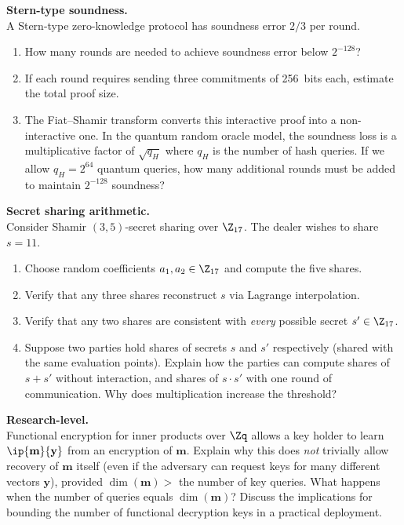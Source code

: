\begin{prob}
\label{prob:ch14-zkp}
\textbf{Stern-type soundness.}\\
A Stern-type zero-knowledge protocol has soundness error $2/3$ per round.
\begin{enumerate}
\item[(a)] How many rounds are needed to achieve soundness error below $2^{-128}$?
\item[(b)] If each round requires sending three commitments of 256~bits each, estimate the total proof size.
\item[(c)] The Fiat--Shamir transform converts this interactive proof into a non-interactive one.  In the quantum random oracle model, the soundness loss is a multiplicative factor of $\sqrt{q_H}$ where $q_H$ is the number of hash queries.  If we allow $q_H = 2^{64}$ quantum queries, how many additional rounds must be added to maintain $2^{-128}$ soundness?
\end{enumerate}
\end{prob}

\begin{prob}
\label{prob:ch14-shamir}
\textbf{Secret sharing arithmetic.}\\
Consider Shamir $(3, 5)$-secret sharing over $\Z_{17}$.  The dealer wishes to share $s = 11$.
\begin{enumerate}
\item[(a)] Choose random coefficients $a_1, a_2 \in \Z_{17}$ and compute the five shares.
\item[(b)] Verify that any three shares reconstruct $s$ via Lagrange interpolation.
\item[(c)] Verify that any two shares are consistent with \emph{every} possible secret $s' \in \Z_{17}$.
\item[(d)] Suppose two parties hold shares of secrets $s$ and $s'$ respectively (shared with the same evaluation points).  Explain how the parties can compute shares of $s + s'$ without interaction, and shares of $s \cdot s'$ with one round of communication.  Why does multiplication increase the threshold?
\end{enumerate}
\end{prob}

\begin{prob}
\label{prob:ch14-advanced}
\textbf{Research-level.}\\
Functional encryption for inner products over $\Zq$ allows a key holder to learn $\ip{\mathbf{m}}{\mathbf{y}}$ from an encryption of $\mathbf{m}$.  Explain why this does \emph{not} trivially allow recovery of $\mathbf{m}$ itself (even if the adversary can request keys for many different vectors $\mathbf{y}$), provided $\dim(\mathbf{m}) > $ the number of key queries.  What happens when the number of queries equals $\dim(\mathbf{m})$?  Discuss the implications for bounding the number of functional decryption keys in a practical deployment.
\end{prob}
